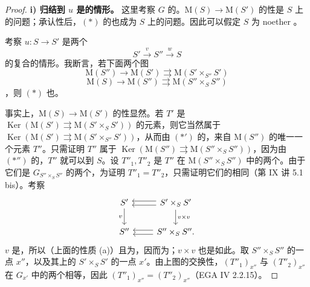 \begin{proof}
\textbf{i) 归结到 $u$ 是的情形。}
这里考察 $G$ 的。$\mathrm M(S)\to\mathrm M(S')$ 的性是 $S$ 上的问题；承认性后，$(*)$ 的也成为 $S$ 上的问题。因此可以假定 $S$ 为 noether 。

考察 $u:S\to S'$ 是两个
\[S'\xrightarrow{v}S''\xrightarrow{w}S\]
的复合的情形。我断言，若下面两个图
\[\mathrm M(S'')\longrightarrow\mathrm M(S')\rightrightarrows\mathrm M(S'\times_{S''}S')\tag{$*'$}\]
\[\mathrm M(S)\longrightarrow\mathrm M(S'')\rightrightarrows\mathrm M(S''\times_S S'')\tag{$*''$}\]
，则 $(*)$ 也。

事实上，$\mathrm M(S)\to\mathrm M(S')$ 的性显然。若 $T'$ 是 $\operatorname{Ker}(\mathrm M(S')\rightrightarrows\mathrm M(S'\times_S S'))$ 的元素，则它当然属于 $\operatorname{Ker}(\mathrm M(S')\rightrightarrows\mathrm M(S'\times_{S''}S'))$，从而由 $(*')$ 的，来自 $\mathrm M(S'')$ 的唯一一个元素 $T''$。只需证明 $T''$ 属于 $\operatorname{Ker}(\mathrm M(S'')\rightrightarrows\mathrm M(S''\times_S S''))$，因为由 $(*'')$ 的，$T''$ 就可以到 $S$。设 $T''_1,T''_2$ 是 $T''$ 在 $\mathrm M(S''\times_S S'')$ 中的两个。由于它们是 $G_{S''\times_S S''}$ 的两个，为证明 $T''_1=T''_2$，只需证明它们的相同（第 IX 讲 5.1 bis）。考察
\[
\begin{tikzcd}
S'\arrow[d,"v"']&S'\times_S S'\arrow[l,shift left]\arrow[l,shift right]\arrow[d,"v\times v"]\\
S''&S''\times_S S''\arrow[l,shift left]\arrow[l,shift right].
\end{tikzcd}
\]
 $v$ 是，所以（上面的性质 (a)）且为，因而为；$v\times v$ 也是如此。取 $S''\times_S S''$ 的一点 $x''$，以及其上的 $S'\times_S S'$ 的一点 $x'$。由上图的交换性，$(T''_1)_{x''}$ 与 $(T''_2)_{x''}$ 在 $G_{x'}$ 中的两个相等，因此 $(T''_1)_{x''}=(T''_2)_{x''}$（EGA IV 2.2.15）。


\end{proof}
